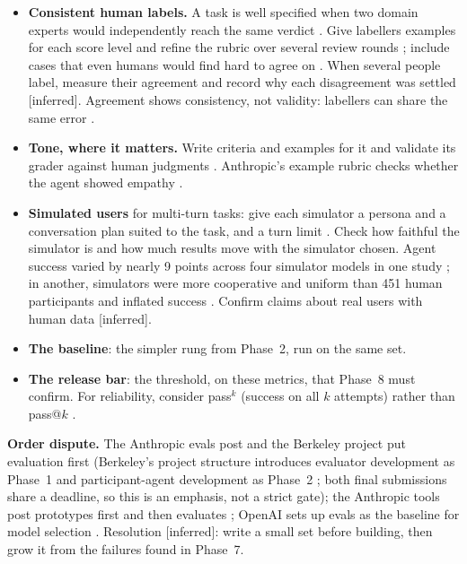 \documentclass[10pt]{article}
\newcommand{\inferred}{\textsf{\small[inferred]}}
\begin{document}
\begin{itemize}
\item \textbf{Consistent human labels.} A task is well specified when two domain experts would independently reach the same verdict \cite[step~2]{anthevals}. Give labellers examples for each score level and refine the rubric over several review rounds \cite[``Human evals'']{oaievalbp}; include cases that even humans would find hard to agree on \cite[``Example edge cases'']{claudetests}. When several people label, measure their agreement and record why each disagreement was settled \inferred. Agreement shows consistency, not validity: labellers can share the same error \cite[p.~27]{medjudge}.
\item \textbf{Tone, where it matters.} Write criteria and examples for it and validate its grader against human judgments \cite[``Grade your evaluations'']{claudetests}. Anthropic's example rubric checks whether the agent showed empathy \cite[``Evaluating conversational agents'']{anthevals}.
\item \textbf{Simulated users} for multi-turn tasks: give each simulator a persona and a conversation plan suited to the task, and a turn limit \cite[``User simulation'', ``User personas'']{adkusersim}. Check how faithful the simulator is and how much results move with the simulator chosen. Agent success varied by nearly 9 points across four simulator models in one study \cite[\S4.1, Table~1]{seshadri}; in another, simulators were more cooperative and uniform than 451 human participants and inflated success \cite[\S5]{zhou}. Confirm claims about real users with human data \inferred.
\item \textbf{The baseline}: the simpler rung from Phase~2, run on the same set.
\item \textbf{The release bar}: the threshold, on these metrics, that Phase~8 must confirm. For reliability, consider pass$^k$ (success on all $k$ attempts) rather than pass@$k$ \cite[p.~30]{brkdeploy}.
\end{itemize}

\textbf{Order dispute.} The Anthropic evals post and the Berkeley project put evaluation first (Berkeley's project structure introduces evaluator development as Phase~1 and participant-agent development as Phase~2 \cite[Grading, Project Timeline]{brkcourse}; both final submissions share a deadline, so this is an emphasis, not a strict gate); the Anthropic tools post prototypes first and then evaluates \cite{anthtools}; OpenAI sets up evals as the baseline for model selection \cite[p.~8]{openai}. Resolution \inferred: write a small set before building, then grow it from the failures found in Phase~7.
\end{document}

